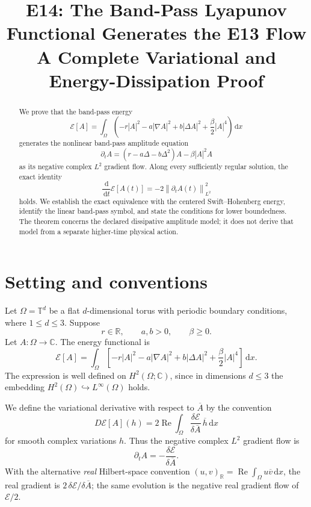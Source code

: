\documentclass[11pt]{article}
\title{E14: The Band-Pass Lyapunov Functional Generates the E13 Flow\\
\large A Complete Variational and Energy-Dissipation Proof}
\date{}
\numberwithin{equation}{section}
\newcommand{\E}{\mathcal E}
\newcommand{\Om}{\Omega}
\newcommand{\dd}{\,\mathrm d}
\newcommand{\norm}[1]{\left\lVert #1\right\rVert}
\begin{document}
\maketitle

\begin{abstract}
We prove that the band-pass energy
\[
\E[A]=\int_\Om\left(
-r|A|^2-a|\nabla A|^2+b|\Delta A|^2
+\frac{\beta}{2}|A|^4
\right)\dd x
\]
generates the nonlinear band-pass amplitude equation
\[
\partial_tA=(r-a\Delta-b\Delta^2)A-\beta|A|^2A
\]
as its negative complex $L^2$ gradient flow. Along every sufficiently
regular solution, the exact identity
\[
\frac{\dd}{\dd t}\E[A(t)]=-2\norm{\partial_t A(t)}_{L^2}^2
\]
holds. We establish the exact equivalence with the centered
Swift--Hohenberg energy, identify the linear band-pass symbol, and
state the conditions for lower boundedness. The theorem concerns the
declared dissipative amplitude model; it does not derive that model
from a separate higher-time physical action.
\end{abstract}

\section{Setting and conventions}

Let $\Om=\mathbb T^d$ be a flat $d$-dimensional torus with periodic
boundary conditions, where $1\le d\le 3$. Suppose
\[
r\in\mathbb R,\qquad a,b>0,\qquad \beta\ge0.
\]
Let $A:\Om\to\mathbb C$. The energy functional is
\begin{equation}\label{eq:E14}
\boxed{\displaystyle
\E[A]=\int_\Om\left[
-r|A|^2-a|\nabla A|^2+b|\Delta A|^2
+\frac{\beta}{2}|A|^4
\right]\dd x.}
\end{equation}
The expression is well defined on $H^2(\Om;\mathbb C)$, since in
dimensions $d\le3$ the embedding
$H^2(\Om)\hookrightarrow L^\infty(\Om)$ holds.

We define the variational derivative with respect to $\overline A$ by
the convention
\begin{equation}\label{eq:convention}
D\E[A](h)=2\operatorname{Re}\int_\Om
\frac{\delta\E}{\delta\overline A}\,\overline h\dd x
\end{equation}
for smooth complex variations $h$. Thus the negative complex
$L^2$ gradient flow is
\[
\partial_t A=-\frac{\delta\E}{\delta\overline A}.
\]
With the alternative \emph{real} Hilbert-space convention
$(u,v)_{\mathbb R}=\operatorname{Re}\int_\Om
u\overline v\dd x$, the real gradient is
$2\,\delta\E/\delta\overline A$; the same evolution is the
negative real gradient flow of $\E/2$.
\end{document}
